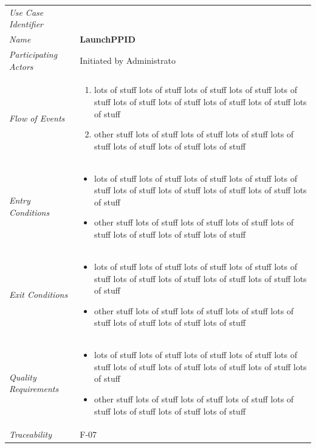 \documentclass[12pt,letterpaper]{article}
\begin{document}
\begin{center}
	\begin{tabu} to 
		\toprule
		Use Case Identifier & \launchppid{} \\
		Name & {\bf LaunchPPID} \\
		Participating Actors & Initiated by Administrato \\
		Flow of Events & 
	    \begin{enumerate}[topsep=-1em]
		    \item lots of stuff lots of stuff lots of stuff lots of stuff lots of stuff lots of stuff lots of stuff lots of stuff lots of stuff lots of stuff
		    \item other stuff lots of stuff lots of stuff lots of stuff lots of stuff lots of stuff lots of stuff lots of stuff
		\end{enumerate} \\

		Entry Conditions &
		\begin{itemize}[topsep=-1em]
		    \item lots of stuff lots of stuff lots of stuff lots of stuff lots of stuff lots of stuff lots of stuff lots of stuff lots of stuff lots of stuff
		    \item other stuff lots of stuff lots of stuff lots of stuff lots of stuff lots of stuff lots of stuff lots of stuff
        \end{itemize} \\

		Exit Conditions &
		\begin{itemize}[topsep=-1em]
		    \item lots of stuff lots of stuff lots of stuff lots of stuff lots of stuff lots of stuff lots of stuff lots of stuff lots of stuff lots of stuff
		    \item other stuff lots of stuff lots of stuff lots of stuff lots of stuff lots of stuff lots of stuff lots of stuff
        \end{itemize} \\

		Quality Requirements &
		\begin{itemize}[topsep=-1em]
		    \item lots of stuff lots of stuff lots of stuff lots of stuff lots of stuff lots of stuff lots of stuff lots of stuff lots of stuff lots of stuff
		    \item other stuff lots of stuff lots of stuff lots of stuff lots of stuff lots of stuff lots of stuff lots of stuff
        \end{itemize} \\

		Traceability & F-07 \\
		\toprule
	\end{tabu}
\end{center}
\end{document}
